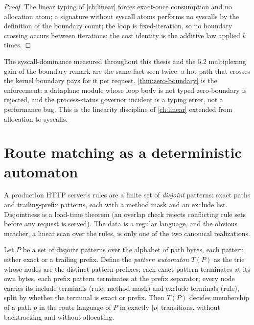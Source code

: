 \begin{proof}
The linear typing of \autoref{ch:linear} forces exact-once consumption and no allocation atom; a
signature without syscall atoms performs no syscalls by the definition
of the boundary count; the loop is fixed-iteration, so no boundary
crossing occurs between iterations; the cost identity is the additive
law applied $k$ times.
\end{proof}

\begin{remark}
The syscall-dominance measured throughout this thesis and the $5.2$
multiplexing gain of the boundary remark are the same fact seen twice:
a hot path that crosses the kernel boundary pays for it per request.
\autoref{thm:zero-boundary} is the enforcement: a dataplane module
whose loop body is not typed zero-boundary is rejected, and the
process-status governor incident is a typing error, not a performance
bug. This is the linearity discipline of \autoref{ch:linear} extended
from allocation to syscalls.
\end{remark}

\section{Route matching as a deterministic automaton}\label{sec:route-automaton}

A production HTTP server's rules are a finite set of \emph{disjoint}
patterns: exact paths and trailing-prefix patterns, each with a method
mask and an exclude list. Disjointness is a load-time theorem (an
overlap check rejects conflicting rule sets before any request is
served). The data is a regular language, and the obvious matcher, a
linear scan over the rules, is only one of the two canonical
realizations.

\begin{theorem}\label{thm:64}\label{thm:route-dfa}
Let $P$ be a set of disjoint patterns over the alphabet of path bytes,
each pattern either exact or a trailing prefix. Define the
\emph{pattern automaton} $T (P)$ as the trie whose nodes are the
distinct pattern prefixes; each exact pattern terminates at its own
bytes, each prefix pattern terminates at the prefix separator; every
node carries its include terminals (rule, method mask) and exclude
terminals (rule), split by whether the terminal is exact or prefix.
Then $T (P)$ decides membership of a path $p$ in the route language of
$P$ in exactly $|p|$ transitions, without backtracking and without
allocating.
\end{theorem}

